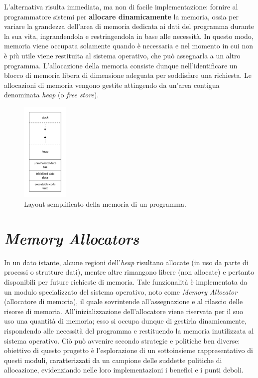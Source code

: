 
L'alternativa risulta immediata, ma non di facile implementazione: fornire al programmatore sistemi per \textbf{allocare dinamicamente} la memoria, ossia per variare la grandezza dell'area di memoria dedicata ai dati del programma durante la sua vita, ingrandendola e restringendola in base alle necessità. In questo modo, memoria viene occupata solamente quando è necessaria e nel momento in cui non è più utile viene restituita al sistema operativo, che può assegnarla a un altro programma. L'allocazione della memoria consiste dunque nell'identificare un blocco di memoria libera di dimensione adeguata per soddisfare una richiesta. Le allocazioni di memoria vengono gestite attingendo da un'area contigua denominata \textit{heap} (o \textit{free store}). 

\begin{figure}[H]
  \centering
  \includegraphics[width=0.2\textwidth]{images/program_memory_layout.png}
  \caption{Layout semplificato della memoria di un programma.}
  \label{fig:program_memory_layout}
\end{figure}

\section{\textit{Memory Allocators}}

In un dato istante, alcune regioni dell'\textit{heap} risultano allocate (in uso da parte di processi o strutture dati), mentre altre rimangono libere (non allocate) e pertanto disponibili per future richieste di memoria. Tale funzionalità è implementata da un modulo specializzato del sistema operativo, noto come \textit{Memory Allocator} (allocatore di memoria), il quale sovrintende all'assegnazione e al rilascio delle risorse di memoria. All'inizializzazione dell'allocatore viene riservata per il suo uso una quantità di memoria; esso si occupa dunque di gestirla dinamicamente, rispondendo alle necessità del programma e restituendo la memoria inutilizzata al sistema operativo. Ciò può avvenire secondo strategie e politiche ben diverse: obiettivo di questo progetto è l'esplorazione di un sottoinsieme rappresentativo di questi moduli, caratterizzati da un campione delle suddette politiche di allocazione, evidenziando nelle loro implementazioni i benefici e i punti deboli. 


